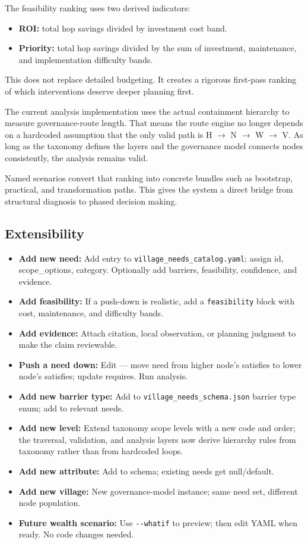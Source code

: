 \documentclass[11pt,a4paper]{article}
\begin{document}
The feasibility ranking uses two derived indicators:
\begin{itemize}
    \item \textbf{ROI:} total hop savings divided by investment cost band.
    \item \textbf{Priority:} total hop savings divided by the sum of investment, maintenance, and implementation difficulty bands.
\end{itemize}

This does not replace detailed budgeting. It creates a rigorous first-pass ranking of which interventions deserve deeper planning first.

The current analysis implementation uses the actual containment hierarchy to measure governance-route length. That means the route engine no longer depends on a hardcoded assumption that the only valid path is H $\rightarrow$ N $\rightarrow$ W $\rightarrow$ V. As long as the taxonomy defines the layers and the governance model connects nodes consistently, the analysis remains valid.

Named scenarios convert that ranking into concrete bundles such as bootstrap, practical, and transformation paths. This gives the 
system a direct bridge from structural diagnosis to phased decision making.

\subsection{Extensibility}

\begin{itemize}
    \item \textbf{Add new need:} Add entry to \texttt{village\_needs\_catalog.yaml}; assign id, scope\_options, category. Optionally add barriers, feasibility, confidence, and evidence.
    \item \textbf{Add feasibility:} If a push-down is realistic, add a \texttt{feasibility} block with cost, maintenance, and difficulty bands.
    \item \textbf{Add evidence:} Attach citation, local observation, or planning judgment to make the claim reviewable.
    \item \textbf{Push a need down:} Edit  --- move need from higher node's satisfies to lower node's satisfies; update requires. Run analysis.
    \item \textbf{Add new barrier type:} Add to \texttt{village\_needs\_schema.json} barrier type enum; add to relevant needs.
    \item \textbf{Add new level:} Extend taxonomy scope levels with a new code and order; the traversal, validation, and analysis layers now derive hierarchy rules from taxonomy rather than from hardcoded loops.
    \item \textbf{Add new attribute:} Add to schema; existing needs get null/default.
    \item \textbf{Add new village:} New governance-model instance; same need set, different node population.
    \item \textbf{Future wealth scenario:} Use \texttt{-{}-whatif} to preview; then edit YAML when ready. No code changes needed.
\end{itemize}
\end{document}
